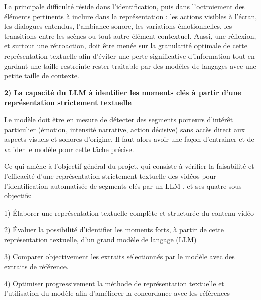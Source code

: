 La principale difficulté réside dans l'identification, puis dans l’octroiement des éléments pertinents à inclure dans la représentation : les actions visibles à l'écran, les dialogues entendus, l’ambiance sonore, les variations émotionnelles, les transitions entre les scènes ou tout autre élément contextuel. Aussi, une réflexion, et surtout une rétroaction, doit être menée sur la granularité optimale de cette représentation textuelle afin d'éviter une perte significative d'information tout en gardant une taille restreinte rester traitable par des modèles de langages avec une petite taille de contexte. 


\textbf{2) La capacité du LLM à identifier les moments clés à partir d'une représentation strictement textuelle}

Le modèle doit être en mesure de détecter des segments porteurs d'intérêt particulier (émotion, intensité narrative, action décisive) sans accès direct aux aspects visuels et sonores d'origine. Il faut alors avoir une façon d’entrainer et de valider le modèle pour cette tâche précise.


Ce qui amène à l'objectif général du projet, qui consiste à vérifier la faisabilité et l'efficacité d'une représentation strictement textuelle des vidéos pour l'identification automatisée de segments clés par un LLM , et ses quatre sous-objectifs:

1) Élaborer une représentation textuelle complète et structurée du contenu vidéo

2) Évaluer la possibilité d’identifier les moments forts, à partir de cette représentation textuelle, d'un grand modèle de langage (LLM)

3) Comparer objectivement les extraits sélectionnés par le modèle avec des extraits de référence.

4) Optimiser progressivement la méthode de représentation textuelle et l'utilisation du modèle afin d'améliorer la concordance avec les références



